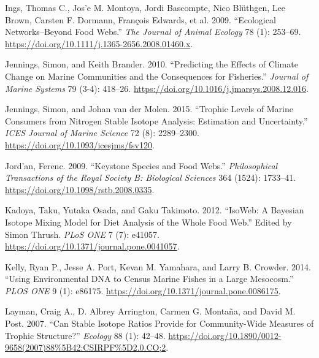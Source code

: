 \documentclass{article}
\newlength{\cslhangindent}
\newlength{\cslentryspacingunit} %
\newenvironment{CSLReferences}[2] %
 {%
  \setlength{\parindent}{0pt}
  \ifodd #1
  \let\oldpar\par
  \def\par{\hangindent=\cslhangindent\oldpar}
  \fi
  \setlength{\parskip}{#2\cslentryspacingunit}
 }%
 {}
\begin{document}
\begin{CSLReferences}{1}{0}
\leavevmode{}%
Ings, Thomas C., Jos'e M. Montoya, Jordi Bascompte, Nico Blüthgen, Lee
Brown, Carsten F. Dormann, François Edwards, et al. 2009. {``Ecological
Networks--Beyond Food Webs.''} \emph{The Journal of Animal Ecology} 78
(1): 253--69. \url{https://doi.org/10.1111/j.1365-2656.2008.01460.x}.

\leavevmode{}%
Jennings, Simon, and Keith Brander. 2010. {``Predicting the Effects of
Climate Change on Marine Communities and the Consequences for
Fisheries.''} \emph{Journal of Marine Systems} 79 (3-4): 418--26.
\url{https://doi.org/10.1016/j.jmarsys.2008.12.016}.

\leavevmode{}%
Jennings, Simon, and Johan van der Molen. 2015. {``Trophic Levels of
Marine Consumers from Nitrogen Stable Isotope Analysis: Estimation and
Uncertainty.''} \emph{ICES Journal of Marine Science} 72 (8):
2289--2300. \url{https://doi.org/10.1093/icesjms/fsv120}.

\leavevmode{}%
Jord'an, Ferenc. 2009. {``Keystone Species and Food Webs.''}
\emph{Philosophical Transactions of the Royal Society B: Biological
Sciences} 364 (1524): 1733--41.
\url{https://doi.org/10.1098/rstb.2008.0335}.

\leavevmode{}%
Kadoya, Taku, Yutaka Osada, and Gaku Takimoto. 2012. {``{IsoWeb}: {A
Bayesian Isotope Mixing Model} for {Diet Analysis} of the {Whole Food
Web}.''} Edited by Simon Thrush. \emph{PLoS ONE} 7 (7): e41057.
\url{https://doi.org/10.1371/journal.pone.0041057}.

\leavevmode{}%
Kelly, Ryan P., Jesse A. Port, Kevan M. Yamahara, and Larry B. Crowder.
2014. {``Using {Environmental DNA} to {Census Marine Fishes} in a {Large
Mesocosm}.''} \emph{PLOS ONE} 9 (1): e86175.
\url{https://doi.org/10.1371/journal.pone.0086175}.

\leavevmode{}%
Layman, Craig A., D. Albrey Arrington, Carmen G. Montaña, and David M.
Post. 2007. {``Can {Stable Isotope Ratios Provide} for {Community}-{Wide
Measures} of {Trophic Structure}?''} \emph{Ecology} 88 (1): 42--48.
\url{https://doi.org/10.1890/0012-9658(2007)88\%5B42:CSIRPF\%5D2.0.CO;2}.


\end{CSLReferences}
\end{document}
